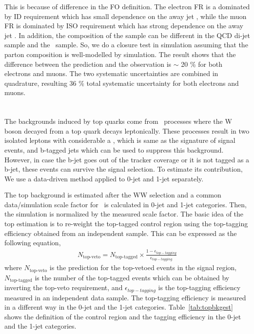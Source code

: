 This is because of difference in the FO definition. The electron FR is a
dominated by ID requirement which has small dependence on the away jet \pt, 
while the muon FR is dominated by ISO requirement which has strong dependence 
on the away jet \pt.
In addition, the composition of the sample can be different in the QCD di-jet sample 
and the \Wjets\ sample. So, we do a closure test in simulation 
assuming that the parton composition is well-modelled by simulation. 
The result shows that the difference between 
the prediction and the observation is $\sim$ 20 \% for both electrons and muons.
The two systematic uncertainties are combined in quadrature, resulting 
36 \% total systematic uncertainty for both electrons and muons. 
\section{ \topbkg }

The backgrounds induced by top quarks come from \topbkg\ processes where 
the W boson decayed from a top quark decays leptonically. These processes 
result in two isolated leptons with considerable a \met, which is 
same as the signature of signal events, and b-tagged jets which
can be used to suppress this background. However, in case the b-jet 
goes out of the tracker coverage or it is not tagged as a b-jet, 
these events can survive the signal selection. To estimate its 
contribution, We use a data-driven method applied to 0-jet and 1-jet separately.

The top background is estimated after the WW selection and a common 
data/simulation scale factor for \topbkg\ is calculated in 0-jet and 1-jet 
categories. Then, the simulation is normalized by the measured scale factor. 
The basic idea of the top estimation is to re-weight the top-tagged control region 
using the top-tagging efficiency obtained from an independent sample. This 
can be expressed as the following equation, 
\begin{eqnarray} 
N_\textrm{top-veto} 
= 
N_{\textrm{top-tagged}} \times
\frac{1 - \epsilon_{top-tagging}}{\epsilon_{top-tagging}}   
\end{eqnarray} 
where $N_\textrm{top-veto}$ is the prediction for the top-vetoed events 
in the signal region, $N_{\textrm{top-tagged}}$ is the number of 
the top-tagged events which can be obtained by inverting the top-veto requirement, 
and $\epsilon_{top-tagging}$ is the top-tagging efficiency 
measured in an independent data sample. The top-tagging efficiency 
is measured in a different way in the 0-jet and the 1-jet categories.
Table~\ref{tab:topbkgest} shows the definition of the control region 
and the tagging efficiency in the 0-jet and the 1-jet categories.

